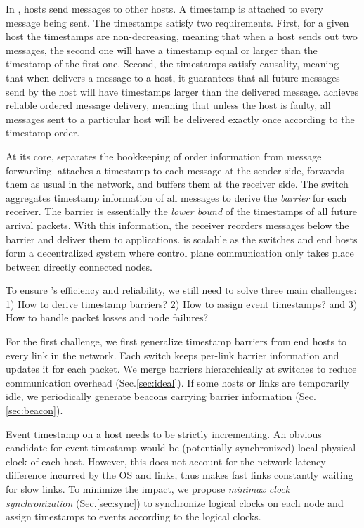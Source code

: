 In \sys, hosts send messages to other hosts. A timestamp is attached to every message being sent. The timestamps satisfy two requirements. First, for a given host the timestamps are non-decreasing, meaning that when a host sends out two messages, the second one will have a timestamp equal or larger than the timestamp of the first one. Second, the timestamps satisfy causality, meaning that when \sys delivers a message to a host, it guarantees that all future messages send by the host will have timestamps larger than the delivered message. \sys achieves reliable ordered message delivery, meaning that unless the host is faulty, all messages sent to a particular host will be delivered exactly once according to the timestamp order. 

At its core, \sys separates the bookkeeping of order information from message forwarding.
\sys attaches a timestamp to each message at the sender side, forwards them as usual in the network, and buffers them at the receiver side.
The switch aggregates timestamp information of all messages to derive the \textit{barrier} for each receiver.
The barrier is essentially the \textit{lower bound} of the timestamps of all future arrival packets.
With this information, the receiver reorders messages below the barrier and deliver them to applications.
\sys is scalable as the switches and end hosts form a decentralized system where control plane communication only takes place between directly connected nodes.

To ensure \sys's efficiency and reliability, we still need to solve three main challenges: 1) How to derive timestamp barriers? 2) How to assign event timestamps? and 3) How to handle packet losses and node failures?

For the first challenge, we first generalize timestamp barriers from end hosts to every link in the network.
Each switch keeps per-link barrier information and updates it for each packet.
We merge barriers hierarchically at switches to reduce communication overhead (Sec.\ref{sec:ideal}).
If some hosts or links are temporarily idle, we periodically generate beacons carrying barrier information (Sec.\ref{sec:beacon}).


Event timestamp on a host needs to be strictly incrementing.
An obvious candidate for event timestamp would be (potentially synchronized) local physical clock of each host.
However, this does not account for the network latency difference incurred by the OS and links, thus makes fast links constantly waiting for slow links.
To minimize the impact, we propose \textit{minimax clock synchronization} (Sec.\ref{sec:sync}) to synchronize logical clocks on each node and assign timestamps to events according to the logical clocks.

